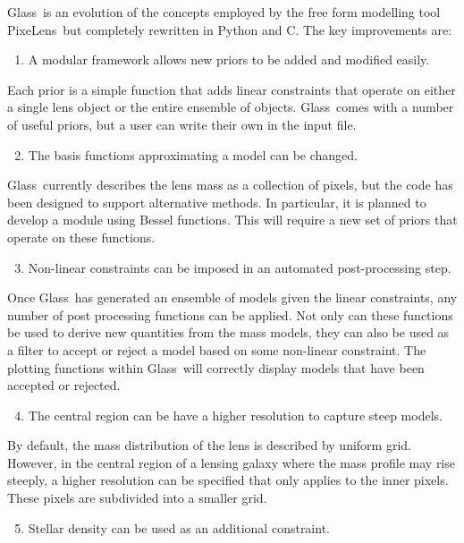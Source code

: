 \documentclass[galley,usenatbib]{mn2e}
\newcommand{\Glass}{{\sc Glass}}
\newcommand{\PixeLens}{{\sc PixeLens}}
\begin{document}
\Glass\ is an evolution of the concepts employed by the free form modelling tool
\PixeLens\ but completely rewritten in Python and C. The key improvements are:
%
\begin{enumerate}
  \setcounter{enumi}{0}
  \item A modular framework allows new priors to be added and modified easily.
\end{enumerate}
%
Each prior is a simple function that adds linear constraints that operate on either
a single lens object or the entire ensemble of objects. \Glass\ comes with a number
of useful priors, but a user can write their own in the input file.
%
\begin{enumerate}
  \setcounter{enumi}{1}
  \item The basis functions approximating a model can be changed. 
\end{enumerate}
%
\Glass\ currently describes the lens mass as a collection of pixels, but the code
has been designed to support alternative methods. In particular, it is planned
to develop a module using Bessel functions. This will require a new set of 
priors that operate on these functions.
%
\begin{enumerate}
  \setcounter{enumi}{2}
  \item Non-linear constraints can be imposed in an automated post-processing step. 
\end{enumerate}
%
Once \Glass\ has generated an ensemble of models given the linear constraints, any number
of post processing functions can be applied. Not only can these functions be used to
derive new quantities from the mass models, they can also be used as a filter to 
accept or reject a model based on some non-linear constraint. The plotting functions
within \Glass\ will correctly display models that have been accepted or rejected.
%
\begin{enumerate}
  \setcounter{enumi}{3}
  \item The central region can be have a higher resolution to capture steep models. 
\end{enumerate}
%
By default, the mass distribution of the lens is described by uniform grid. However,
in the central region of a lensing galaxy where the mass profile may rise steeply,
a higher resolution can be specified that only applies to the inner pixels. These
pixels are subdivided into a smaller grid.
%
\begin{enumerate}
  \setcounter{enumi}{4}
  \item Stellar density can be used as an additional constraint.  
\end{enumerate}
\end{document}
